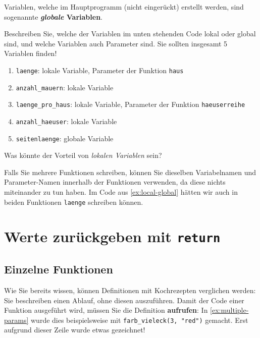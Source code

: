 Variablen, welche im Hauptprogramm (nicht eingerückt) erstellt werden, sind sogenannte \textbf{\textit{globale} Variablen}.

\begin{myexercise}\label{ex:local-global}
	Beschreiben Sie, welche der Variablen im unten stehenden Code lokal oder global sind, und welche Variablen auch Parameter sind. Sie sollten insgesamt 5 Variablen finden!
	

	\begin{myanswer}
		\begin{enumerate}
			\item \lstinline|laenge|: lokale Variable, Parameter der Funktion \lstinline|haus|
			\item \lstinline|anzahl_mauern|: lokale Variable
			\item \lstinline|laenge_pro_haus|: lokale Variable, Parameter der Funktion \lstinline|haeuserreihe|
			\item \lstinline|anzahl_haeuser|: lokale Variable
			\item \lstinline|seitenlaenge|: globale Variable
		\end{enumerate}
	\end{myanswer}
\end{myexercise}

\begin{myexercise}
	Was könnte der Vorteil von \textit{lokalen Variablen} sein?
	\begin{myanswer}
		Falls Sie mehrere Funktionen schreiben, können Sie dieselben Variabelnamen und Parameter-Namen innerhalb der Funktionen verwenden, da diese nichts miteinander zu tun haben. Im Code aus \cref{ex:local-global} hätten wir auch in beiden Funktionen \texttt{laenge} schreiben können.
	\end{myanswer}
\end{myexercise}


\section{Werte zurückgeben mit \texorpdfstring{\lstinline|return|}{return}}
\subsection{Einzelne Funktionen}
Wie Sie bereits wissen, können Definitionen mit Kochrezepten verglichen werden: Sie beschreiben einen Ablauf, ohne diesen auszuführen. Damit der Code einer Funktion ausgeführt wird, müssen Sie die Definition \textbf{aufrufen}: In \cref{ex:multiple-params} wurde dies beispielsweise mit \lstinline|farb_vieleck(3, "red")| gemacht. Erst aufgrund dieser Zeile wurde etwas gezeichnet!

